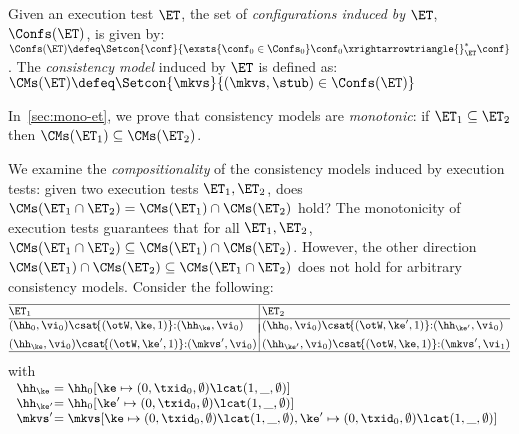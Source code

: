 \begin{definition}
\label{def:cm}
Given an execution test $\ET$,  
the set of \emph{configurations induced by $\ET$},  $\Confs(\ET)$, is   given by: 
\(
\Confs(\ET)\defeq 
\Setcon{ \conf}{ 
	\exsts{\conf_0 \in \Confs_0}
	\conf_0 \xrightarrowtriangle{}_{\ET}^{*} \conf
}
\).
The \emph{consistency model} induced by $\ET$ is defined as:
\( 
\CMs(\ET) \defeq \Setcon{ \mkvs }{ (\mkvs, \stub) \in \Confs(\ET) }
\)
\end{definition}


\noindent In~\cref{sec:mono-et}, we prove that consistency models are 
\emph{monotonic}: 
if  $\ET_1 \subseteq \ET_2$ then $\CMs(\ET_1) \subseteq \CMs(\ET_2)$.

We examine the \emph{compositionality} of the consistency models induced by execution tests:  
\ie given two execution tests $\ET_1, \ET_2$, does 
$\CMs(\ET_1 \cap \ET_2) = \CMs(\ET_1) \cap \CMs(\ET_2)$ hold? 
The monotonicity of execution tests guarantees that 
 for all $\ET_1, \ET_2$, \( \CMs(\ET_1 \cap \ET_2) \subseteq \CMs(\ET_1) \cap \CMs(\ET_2) \). 
However, the other direction \( \CMs(\ET_1) \cap \CMs(\ET_2) \subseteq \CMs(\ET_1 \cap \ET_2) \) does not hold for arbitrary consistency models.
Consider the following:
%
\[
\small
\begin{array}{@{}l @{\hspace{2pt}} | @{\hspace{2pt}} l@{}}
    \hline
    \ET_1 & \ET_2 \\
%    
    \hline
    (\hh_{0}, \vi_{0}) \csat\! \{(\otW, \ke, 1)\} {:} ( \hh_{\ke}, \vi_{0})
    &
    (\hh_{0}, \vi_{0}) \csat\! \{(\otW, \ke', 1)\} {:} ( \hh_{\ke'}, \vi_{0}) 
    \vspace*{-7pt}\\\\
    (\hh_{\ke}, \vi_{0}) \csat  \!\{(\otW, \ke', 1)\} {:} (\mkvs',\vi_{0}) 
    &
    (\hh_{\ke'}, \vi_{0}) \csat \!\{(\otW, \ke, 1)\} {:} (\mkvs',\vi_{1}) 
    \\
\hline
\end{array}
\]%
%
with%
%
{
\(
\small
\begin{array}[t]{l@{} l}
    \hh_{\ke} & = \hh_{0}[\ke \mapsto (0, \txid_{0}, \emptyset) \lcat (1, \_, \emptyset)] \\
    \hh_{\ke'} & = \hh_{0}[\ke' \mapsto (0, \txid_{0}, \emptyset) \lcat (1, \_, \emptyset)] \\
    \mkvs' & = \mkvs[\ke \mapsto (0, \txid_{0}, \emptyset) \lcat (1, \_, \emptyset) 
                ,\ke' \mapsto (0, \txid_{0}, \emptyset) \lcat (1, \_, \emptyset)] \\
\end{array}
\)%
}%
%

